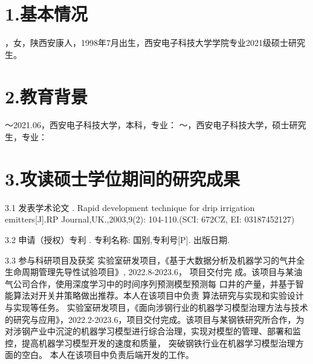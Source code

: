 \begin{resume}
\section*{1.\hspace{0.75em}基本情况}
，女，陕西安康人，1998年7月出生，西安电子科技大学学院专业2021级硕士研究生。
\section*{2.\hspace{0.75em}教育背景}
\begin{resumelist*}
～2021.06，西安电子科技大学，本科，专业：
～\phantom{}，西安电子科技大学，硕士研究生，专业：
\end{resumelist*}
\section*{3.\hspace{0.75em}攻读硕士学位期间的研究成果}
\begin{resumelist}{\hspace{-0.25em}3.1\hspace{0.5em} 发表学术论文}
\resumelistitem {}. Rapid development technique for drip irrigation emitters[J].RP Journal,UK.,2003,9(2): 104-110.(SCI: 672CZ, EI: 03187452127)
\end{resumelist}
\begin{resumelist}{\hspace{-0.25em}3.2\hspace{0.5em} 申请（授权）专利}
\resumelistitem {}. 专利名称: 国别,专利号[P]. 出版日期.
\end{resumelist}
\begin{resumelist}{\hspace{-0.25em}3.3\hspace{0.5em} 参与科研项目及获奖}
\resumelistitem 实验室研发项目，《基于大数据分析及机器学习的气井全生命周期管理先导性试验项目》, 2022.8-2023.6， 项目交付完
成。该项目与某油气公司合作，使用深度学习中的时间序列预测模型预测每
口井的产量，并基于智能算法对开关井策略做出推荐。本人在该项目中负责
算法研究与实现和实验设计与实现等任务。
\resumelistitem 实验室研发项目，《面向涉钢行业的机器学习模型治理方法与技术的研究与应用》，2022.2-2023.6，项目交付完成。该项目与某钢铁研究所合作，为对涉钢产业中沉淀的机器学习模型进行综合治理，实现对模型的管理、部署和监控，提高机器学习模型开发的速度和质量，
突破钢铁行业在机器学习模型治理方面的空白。 本人在该项目中负责后端开发的工作。
\end{resumelist}
\end{resume}
